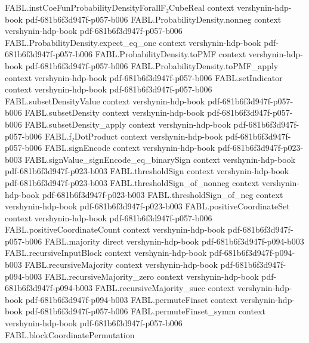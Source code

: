 \begin{theorem}
\proofstep
  {FABL.instCoeFunProbabilityDensityForallF₂CubeReal}
  {context}
  {vershynin-hdp-book}
  {pdf-681b6f3d947f-p057-b006}
\proofstep
  {FABL.ProbabilityDensity.nonneg}
  {context}
  {vershynin-hdp-book}
  {pdf-681b6f3d947f-p057-b006}
\proofstep
  {FABL.ProbabilityDensity.expect_eq_one}
  {context}
  {vershynin-hdp-book}
  {pdf-681b6f3d947f-p057-b006}
\proofstep
  {FABL.ProbabilityDensity.toPMF}
  {context}
  {vershynin-hdp-book}
  {pdf-681b6f3d947f-p057-b006}
\proofstep
  {FABL.ProbabilityDensity.toPMF_apply}
  {context}
  {vershynin-hdp-book}
  {pdf-681b6f3d947f-p057-b006}
\proofstep
  {FABL.setIndicator}
  {context}
  {vershynin-hdp-book}
  {pdf-681b6f3d947f-p057-b006}
\proofstep
  {FABL.subsetDensityValue}
  {context}
  {vershynin-hdp-book}
  {pdf-681b6f3d947f-p057-b006}
\proofstep
  {FABL.subsetDensity}
  {context}
  {vershynin-hdp-book}
  {pdf-681b6f3d947f-p057-b006}
\proofstep
  {FABL.subsetDensity_apply}
  {context}
  {vershynin-hdp-book}
  {pdf-681b6f3d947f-p057-b006}
\proofstep
  {FABL.f₂DotProduct}
  {context}
  {vershynin-hdp-book}
  {pdf-681b6f3d947f-p057-b006}
\proofstep
  {FABL.signEncode}
  {context}
  {vershynin-hdp-book}
  {pdf-681b6f3d947f-p023-b003}
\proofstep
  {FABL.signValue_signEncode_eq_binarySign}
  {context}
  {vershynin-hdp-book}
  {pdf-681b6f3d947f-p023-b003}
\proofstep
  {FABL.thresholdSign}
  {context}
  {vershynin-hdp-book}
  {pdf-681b6f3d947f-p023-b003}
\proofstep
  {FABL.thresholdSign_of_nonneg}
  {context}
  {vershynin-hdp-book}
  {pdf-681b6f3d947f-p023-b003}
\proofstep
  {FABL.thresholdSign_of_neg}
  {context}
  {vershynin-hdp-book}
  {pdf-681b6f3d947f-p023-b003}
\proofstep
  {FABL.positiveCoordinateSet}
  {context}
  {vershynin-hdp-book}
  {pdf-681b6f3d947f-p057-b006}
\proofstep
  {FABL.positiveCoordinateCount}
  {context}
  {vershynin-hdp-book}
  {pdf-681b6f3d947f-p057-b006}
\proofstep
  {FABL.majority}
  {direct}
  {vershynin-hdp-book}
  {pdf-681b6f3d947f-p094-b003}
\proofstep
  {FABL.recursiveInputBlock}
  {context}
  {vershynin-hdp-book}
  {pdf-681b6f3d947f-p094-b003}
\proofstep
  {FABL.recursiveMajority}
  {context}
  {vershynin-hdp-book}
  {pdf-681b6f3d947f-p094-b003}
\proofstep
  {FABL.recursiveMajority_zero}
  {context}
  {vershynin-hdp-book}
  {pdf-681b6f3d947f-p094-b003}
\proofstep
  {FABL.recursiveMajority_succ}
  {context}
  {vershynin-hdp-book}
  {pdf-681b6f3d947f-p094-b003}
\proofstep
  {FABL.permuteFinset}
  {context}
  {vershynin-hdp-book}
  {pdf-681b6f3d947f-p057-b006}
\proofstep
  {FABL.permuteFinset_symm}
  {context}
  {vershynin-hdp-book}
  {pdf-681b6f3d947f-p057-b006}
\proofstep
  {FABL.blockCoordinatePermutation}

\end{theorem}
